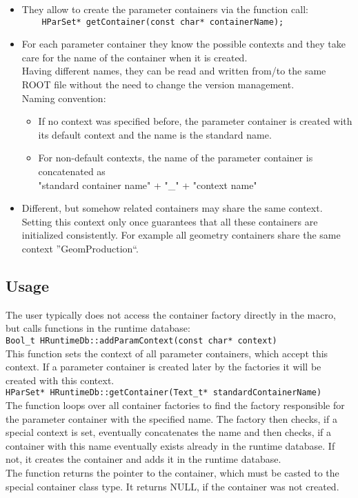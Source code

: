 \begin{itemize}
 \item They allow to create the parameter containers via the function call:\\
   \verb+    HParSet* getContainer(const char* containerName);+  
 \item For each parameter container they know the possible contexts and they take care for the name of the container when 
   it is created.\\
   Having different names, they can be read and written from/to the same ROOT file without the need to change the 
   version management.\\
   Naming convention:
   \begin{itemize}
     \item If no context was specified before, the parameter container is created with its default context and the 
       name is the standard name.
     \item For non-default contexts, the name of the parameter container is concatenated as\\
       "standard container name" + "\_" + "context name"
    \end{itemize}
 \item Different, but somehow related containers may share the same context.\\ 
   Setting this context only once guarantees that all these containers are initialized consistently.
   For example all geometry containers share the same context ''GeomProduction``.
\end{itemize}

\subsection*{Usage}

The user typically does not access the container factory directly in the macro, but calls functions in the runtime database:\\

\verb+Bool_t HRuntimeDb::addParamContext(const char* context)+\\
This function sets the context of all parameter containers, which accept this context. If a parameter container is 
created later by the factories it will be created with this context.\\

\verb+HParSet* HRuntimeDb::getContainer(Text_t* standardContainerName)+\\
The function loops over all container factories to find the factory responsible for the parameter container with the specified 
name. The factory then checks, if a special context is set, eventually concatenates the name and then checks, if a container 
with this name eventually exists already in the runtime database. If not, it creates the container and adds it in the runtime 
database.\\
The function returns the pointer to the container, which must be casted to the special container class type. It returns NULL, 
if the container was not created.


